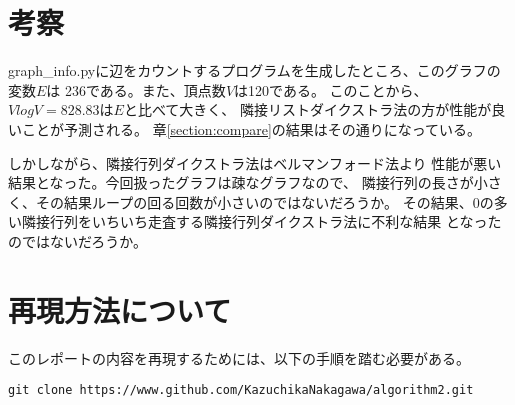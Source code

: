 \documentclass[12pt, a4paper, dvipdfmx]{jarticle}
\begin{document}
\section{考察}
graph\_info.pyに辺をカウントするプログラムを生成したところ、このグラフの変数$E$は
236である。また、頂点数$V$は120である。
このことから、$V log V = 828.83$は$E$と比べて大きく、
隣接リストダイクストラ法の方が性能が良いことが予測される。
章\ref{section:compare}の結果はその通りになっている。

しかしながら、隣接行列ダイクストラ法はベルマンフォード法より
性能が悪い結果となった。今回扱ったグラフは疎なグラフなので、
隣接行列の長さが小さく、その結果ループの回る回数が小さいのではないだろうか。
その結果、0の多い隣接行列をいちいち走査する隣接行列ダイクストラ法に不利な結果
となったのではないだろうか。

\section{再現方法について}
このレポートの内容を再現するためには、以下の手順を踏む必要がある。
\begin{lstlisting}[caption=リポジトリのクローン,label=sample]
 git clone https://www.github.com/KazuchikaNakagawa/algorithm2.git
\end{lstlisting}
\end{document}
